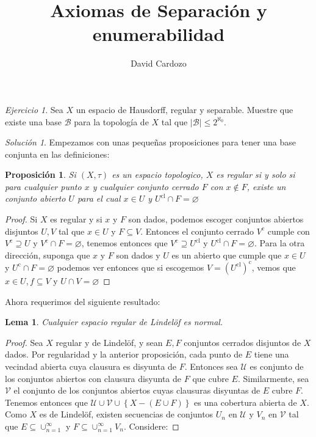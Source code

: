 \documentclass[notitlepage]{report}
\author{David Cardozo}
\title{Axiomas de Separación y enumerabilidad}
\newtheorem{lem}[thm]{Lema}
\newtheorem{prop}{Proposición}
\theoremstyle{definition}
\theoremstyle{remark}
\newtheorem{exc}{Ejercicio}
\newtheorem*{sol}{Solución}
\newcommand{\lrp}[1]{\left( #1 \right)}
\newcommand{\closure}[1]{ #1^{\textrm{cl}}}
\renewcommand*{\complement}[1]{#1^\text{c}}
\begin{document}
\maketitle
\begin{exc}
	Sea $ X $ un espacio de Hausdorff, regular y separable. Muestre que existe una base $ \mathcal{B} $ para la topología de $ X $ tal que $ |\mathcal{B}|\leq 2^{\aleph_0} $.
\end{exc}

\begin{sol}
	Empezamos con unas pequeñas proposiciones para tener una base conjunta en las definiciones:
	\begin{prop}
		Si $ (X,\tau) $ es un espacio topologico, $ X $ es regular si y solo si para cualquier punto $ x $ y cualquier conjunto cerrado $ F $ con $ x \notin F $, existe un conjunto abierto $ U $ para el cual $ x \in U $ y $ \closure{U} \cap F = \varnothing $
	\end{prop}
	\begin{proof}
		Si $ X $ es regular y si $ x $ y $ F $ son dados, podemos escoger conjuntos abiertos disjuntos $ U,V $ tal que $ x \in U $ y $ F \subseteq V $. Entonces el conjunto cerrado $ \complement{V}  $ cumple con $ \complement{V} \supseteq U $ y $ \complement{V} \cap F = \varnothing $, tenemos entonces que $ \complement{V} \supseteq \closure{U} $ y $ \closure{U} \cap F = \varnothing $. Para la otra dirección, suponga que $ x $ y $ F $ son dados y $ U $ es un abierto que cumple que $ x \in U $ y $ \complement{U} \cap F = \varnothing $ podemos ver entonces que si escogemos $ V = \complement{\lrp{\closure{U}}} $, vemos que $ x \in U, f \subseteq V $ y $ U \cap V = \varnothing $
	\end{proof}
	Ahora requerimos del siguiente resultado:
	\begin{lem}
		Cualquier espacio regular de Lindelöf es normal.
	\end{lem}
	\begin{proof}
		Sea $ X $ regular y de Lindelöf, y sean $ E,F $ conjuntos cerrados disjuntos de $ X $ dados. Por regularidad y la anterior proposición, cada punto de $ E $ tiene una vecindad abierta cuya clausura es disyunta de $ F $. Entonces sea $ \mathcal{U} $ es conjunto de los conjuntos abiertos con clausura disyunta de $ F $ que cubre $ E $. Similarmente, sea $ \mathcal{V} $ el conjunto de los conjuntos abiertos cuyas clausuras disyuntas de $ E $ cubre $ F $. Tenemos entonces que $ \mathcal{U} \cup \mathcal{V} \cup \left\lbrace X - \lrp{E \cup F} \right\rbrace $ es una cobertura abierta de $ X $. Como $ X $ es de Lindelöf, existen secuencias de conjuntos $ U_n $ en $ \mathcal{U} $ y $ V_n $ en $ \mathcal{V} $ tal que \( E \subseteq \cup_{n = 1}^\infty \) y $ F \subseteq \cup_{n = 1}^\infty V_n $. Considere:

\end{proof}
\end{sol}
\end{document}

